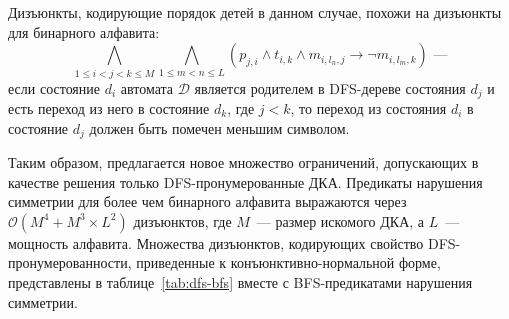 Дизъюнкты, кодирующие порядок детей в данном случае, похожи на дизъюнкты для бинарного алфавита:
\begin{equation*}
  \bigwedge\limits_{1 \leq i < j < k \leq M} \bigwedge_{1 \leq m < n \leq L} \left(p_{j,i} \wedge t_{i,k} \wedge m_{i,l_n,j} \rightarrow \neg m_{i,l_m,k}\right)\text{~---}
\end{equation*}
если состояние $d_{i}$ автомата $\mathcal{D}$ является родителем в DFS-дереве состояния $d_{j}$ и есть переход из него в состояние $d_{k}$, где $j < k$, то переход из состояния $d_{i}$ в состояние $d_{j}$ должен быть помечен меньшим символом. 

Таким образом, предлагается новое множество ограничений, допускающих в качестве решения только DFS-пронумерованные ДКА.
Предикаты нарушения симметрии для более чем бинарного алфавита выражаются через $\mathcal{O}\left(M^4 + M^3 \times L^2\right)$ дизъюнктов, где $M$~--- размер искомого ДКА, а $L$~--- мощность алфавита.
Множества дизъюнктов, кодирующих свойство DFS-пронумерованности, приведенные к конъюнктивно-нормальной форме, представлены в таблице~\ref{tab:dfs-bfs} вместе с BFS-предикатами нарушения симметрии.

